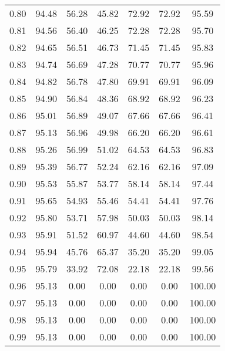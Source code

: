 \begin{tabular}{|c|c|c|c|c|c|c|}
      0.80 &     94.48 &     56.28 &      45.82 &   72.92 &      72.92 &         95.59 \\
      0.81 &     94.56 &     56.40 &      46.25 &   72.28 &      72.28 &         95.70 \\
      0.82 &     94.65 &     56.51 &      46.73 &   71.45 &      71.45 &         95.83 \\
      0.83 &     94.74 &     56.69 &      47.28 &   70.77 &      70.77 &         95.96 \\
      0.84 &     94.82 &     56.78 &      47.80 &   69.91 &      69.91 &         96.09 \\
      0.85 &     94.90 &     56.84 &      48.36 &   68.92 &      68.92 &         96.23 \\
      0.86 &     95.01 &     56.89 &      49.07 &   67.66 &      67.66 &         96.41 \\
      0.87 &     95.13 &     56.96 &      49.98 &   66.20 &      66.20 &         96.61 \\
      0.88 &     95.26 &     56.99 &      51.02 &   64.53 &      64.53 &         96.83 \\
      0.89 &     95.39 &     56.77 &      52.24 &   62.16 &      62.16 &         97.09 \\
      0.90 &     95.53 &     55.87 &      53.77 &   58.14 &      58.14 &         97.44 \\
      0.91 &     95.65 &     54.93 &      55.46 &   54.41 &      54.41 &         97.76 \\
      0.92 &     95.80 &     53.71 &      57.98 &   50.03 &      50.03 &         98.14 \\
      0.93 &     95.91 &     51.52 &      60.97 &   44.60 &      44.60 &         98.54 \\
      0.94 &     95.94 &     45.76 &      65.37 &   35.20 &      35.20 &         99.05 \\
      0.95 &     95.79 &     33.92 &      72.08 &   22.18 &      22.18 &         99.56 \\
      0.96 &     95.13 &      0.00 &       0.00 &    0.00 &       0.00 &        100.00 \\
      0.97 &     95.13 &      0.00 &       0.00 &    0.00 &       0.00 &        100.00 \\
      0.98 &     95.13 &      0.00 &       0.00 &    0.00 &       0.00 &        100.00 \\
      0.99 &     95.13 &      0.00 &       0.00 &    0.00 &       0.00 &        100.00 \\
\bottomrule
\end{tabular}
